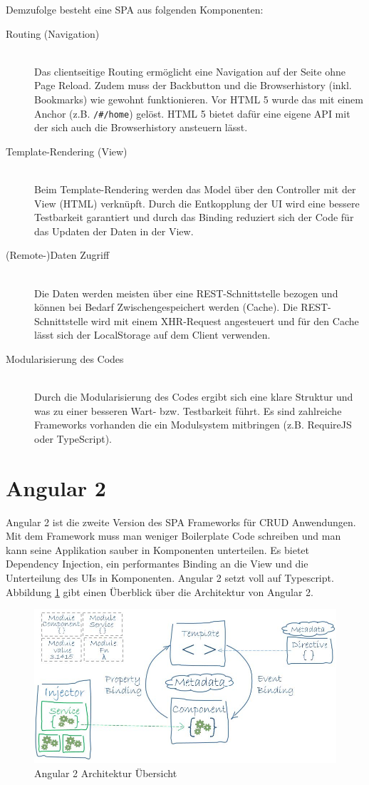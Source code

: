 \newpage

Demzufolge besteht eine SPA aus folgenden Komponenten:
\begin{description}
	\item[Routing (Navigation)] \hfil \\
	Das clientseitige Routing ermöglicht eine Navigation auf der Seite ohne Page Reload. Zudem muss der Backbutton und die Browserhistory (inkl. Bookmarks) wie gewohnt funktionieren. Vor HTML 5 wurde das mit einem Anchor (z.B. \lstinline|/#/home|) gelöst. HTML 5 bietet dafür eine eigene API mit der sich auch die Browserhistory ansteuern lässt.
	\item[Template-Rendering (View)] \hfil \\
	Beim Template-Rendering werden das Model über den Controller mit der View (HTML) verknüpft. Durch die Entkopplung der UI wird eine bessere Testbarkeit garantiert und durch das Binding reduziert sich der Code für das Updaten der Daten in der View.
	\item[(Remote-)Daten Zugriff] \hfil \\
	Die Daten werden meisten über eine REST-Schnittstelle bezogen und können bei Bedarf Zwischengespeichert werden (Cache). Die REST-Schnittstelle wird mit einem XHR-Request angesteuert und für den Cache lässt sich der LocalStorage auf dem Client verwenden.
	\item[Modularisierung des Codes] \hfil \\
	Durch die Modularisierung des Codes ergibt sich eine klare Struktur und was zu einer besseren Wart- bzw. Testbarkeit führt. Es sind zahlreiche Frameworks vorhanden die ein Modulsystem mitbringen (z.B. RequireJS oder TypeScript).
\end{description}

\section{Angular 2}

Angular 2 ist die zweite Version des SPA Frameworks für CRUD Anwendungen. Mit dem Framework muss man weniger Boilerplate Code schreiben und man kann seine Applikation sauber in Komponenten unterteilen. Es bietet Dependency Injection, ein performantes Binding an die View und die Unterteilung des UIs in Komponenten. Angular 2 setzt voll auf Typescript. Abbildung \ref{fig:angular2-architecture} gibt einen Überblick über die Architektur von Angular 2.
\begin{figure}[h!]
\centering
\includegraphics[width=0.7\linewidth]{fig/angular2-architecture}
\caption{Angular 2 Architektur Übersicht}
\label{fig:angular2-architecture}
\end{figure}

